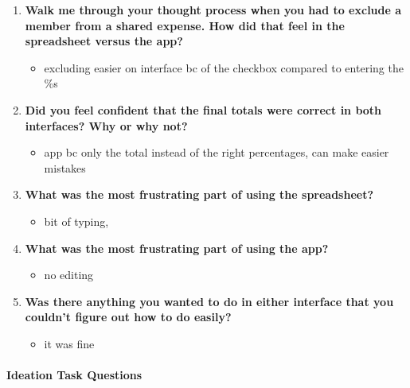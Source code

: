 \documentclass[12pt,a4paper]{article}
\begin{document}
\begin{enumerate}
    \item \textbf{Walk me through your thought process when you had to exclude a member from a shared expense. How did that feel in the spreadsheet versus the app?}
    
    \begin{itemize}
        \item excluding easier on interface bc of the checkbox compared to entering the \%s
    \end{itemize}
    
    \item \textbf{Did you feel confident that the final totals were correct in both interfaces? Why or why not?}
    
    \begin{itemize}
        \item app bc only the total instead of the right percentages, can make easier mistakes
    \end{itemize}
    
    \item \textbf{What was the most frustrating part of using the spreadsheet?}
    
    \begin{itemize}
        \item bit of typing,
    \end{itemize}
    
    \item \textbf{What was the most frustrating part of using the app?}
    
    \begin{itemize}
        \item no editing
    \end{itemize}
    
    \item \textbf{Was there anything you wanted to do in either interface that you couldn't figure out how to do easily?}
    
    \begin{itemize}
        \item it was fine
    \end{itemize}
\end{enumerate}

\paragraph{Ideation Task Questions}
\end{document}
